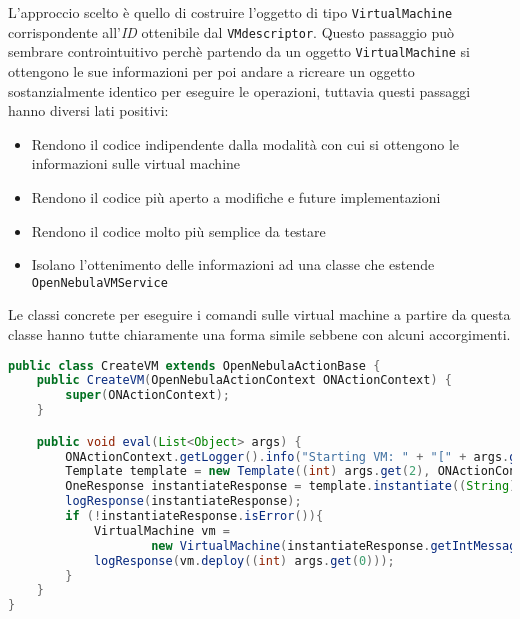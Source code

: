 L'approccio scelto è quello di costruire l'oggetto di tipo \texttt{VirtualMachine} corrispondente all'\emph{ID} ottenibile dal \texttt{VMdescriptor}. Questo passaggio può sembrare controintuitivo perchè partendo da un oggetto \texttt{VirtualMachine} si ottengono le sue informazioni per poi andare a ricreare un oggetto sostanzialmente identico per eseguire le operazioni, tuttavia questi passaggi hanno diversi lati positivi:
\begin{itemize}
    \item Rendono il codice indipendente dalla modalità con cui si ottengono le informazioni sulle virtual machine
    \item Rendono il codice più aperto a modifiche e future implementazioni
    \item Rendono il codice molto più semplice da testare
    \item Isolano l'ottenimento delle informazioni ad una classe che estende \texttt{OpenNebulaVMService}
\end{itemize}
Le classi concrete per eseguire i comandi sulle virtual machine a partire da questa classe hanno tutte chiaramente una forma simile sebbene con alcuni accorgimenti.
\begin{lstlisting}[language=Java, caption=Classe per avviare una \texttt{VirtualMachine}, label=code:CreateVM, basicstyle=\fontsize{8.5}{9.5}\ttfamily]
public class CreateVM extends OpenNebulaActionBase {
	public CreateVM(OpenNebulaActionContext ONActionContext) {
		super(ONActionContext);
	}

	public void eval(List<Object> args) {
		ONActionContext.getLogger().info("Starting VM: " + "[" + args.get(2) + ", " + args.get(1) + "]");
		Template template = new Template((int) args.get(2), ONActionContext.getClient());
		OneResponse instantiateResponse = template.instantiate((String) args.get(1));
		logResponse(instantiateResponse);
		if (!instantiateResponse.isError()){
			VirtualMachine vm = 
					new VirtualMachine(instantiateResponse.getIntMessage(), ONActionContext.getClient());
			logResponse(vm.deploy((int) args.get(0)));
		}		
	}
}
\end{lstlisting}
